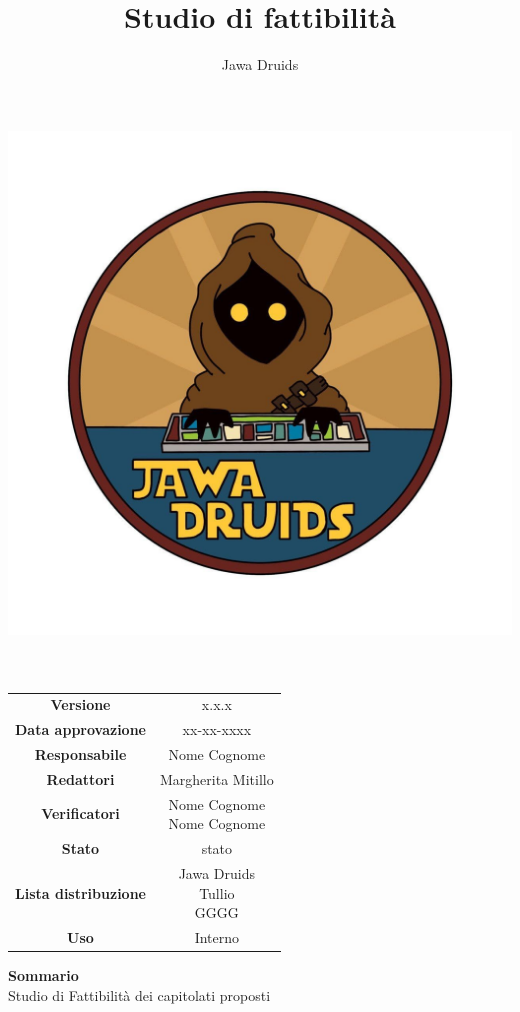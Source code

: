 \documentclass[a4paper,12pt]{report}
\begin{document}
\makeatletter
\begin{titlepage}
	\begin{center}
	\vspace*{-4,0cm}
	\author{Jawa Druids}
	\title{Studio di fattibilità}
	\date{}
	\includegraphics[width=0.7\linewidth]{../immagini/DRUIDSLOGO.jpg}\\[4ex]
	{\huge \bfseries  \@title }\\[2ex] 
	{\LARGE  \@author}\\[50ex]
	\vspace*{-8,0cm}
	\begin{table}[H]
		\centering
		\begin{tabular}{c|c}
			\textbf{Versione} & x.x.x \\
			\textbf{Data approvazione} & xx-xx-xxxx\\
			\textbf{Responsabile} & Nome Cognome\\
			\textbf{Redattori} & Margherita Mitillo \\
			\textbf{Verificatori} & \makecell{Nome Cognome \\ Nome Cognome} \\
			\textbf{Stato} & stato\\
			\textbf{Lista distribuzione} & \makecell{Jawa Druids \\ Tullio \\ GGGG}\\
			\textbf{Uso} & Interno			
		\end{tabular}
	\end{table}
	\fontsize{17}{12}\textbf{Sommario} \\
	Studio di Fattibilità dei capitolati proposti
	\end{center}
\end{titlepage}
\makeatother


	
\tableofcontents{}










\end{document}
